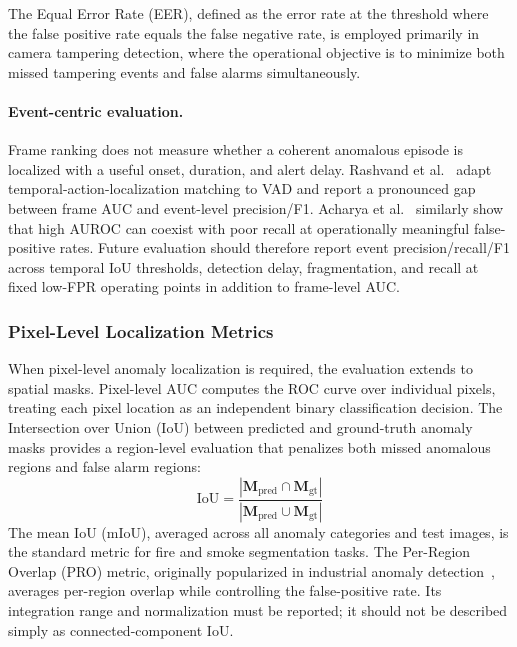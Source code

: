 \documentclass[10pt,a4paper]{article}
\begin{document}
The Equal Error Rate (EER), defined as the error rate at the threshold where the false positive rate equals the false negative rate, is employed primarily in camera tampering detection, where the operational objective is to minimize both missed tampering events and false alarms simultaneously.

\paragraph{Event-centric evaluation.} Frame ranking does not measure whether a coherent anomalous episode is localized with a useful onset, duration, and alert delay. Rashvand et al.~\citeyearpar{rashvand2026frames} adapt temporal-action-localization matching to VAD and report a pronounced gap between frame AUC and event-level precision/F1. Acharya et al.~\citeyearpar{acharya2026road} similarly show that high AUROC can coexist with poor recall at operationally meaningful false-positive rates. Future evaluation should therefore report event precision/recall/F1 across temporal IoU thresholds, detection delay, fragmentation, and recall at fixed low-FPR operating points in addition to frame-level AUC.

\subsubsection{Pixel-Level Localization Metrics}
\label{subsubsec:pixel_metrics}

When pixel-level anomaly localization is required, the evaluation extends to spatial masks. Pixel-level AUC computes the ROC curve over individual pixels, treating each pixel location as an independent binary classification decision. The Intersection over Union (IoU) between predicted and ground-truth anomaly masks provides a region-level evaluation that penalizes both missed anomalous regions and false alarm regions:
\begin{equation}
    \text{IoU} = \frac{|\mathbf{M}_{\text{pred}} \cap \mathbf{M}_{\text{gt}}|}{|\mathbf{M}_{\text{pred}} \cup \mathbf{M}_{\text{gt}}|}
    \label{eq:iou}
\end{equation}
The mean IoU (mIoU), averaged across all anomaly categories and test images, is the standard metric for fire and smoke segmentation tasks. The Per-Region Overlap (PRO) metric, originally popularized in industrial anomaly detection~\citep{bergmann2019mvtec}, averages per-region overlap while controlling the false-positive rate. Its integration range and normalization must be reported; it should not be described simply as connected-component IoU.
\end{document}

